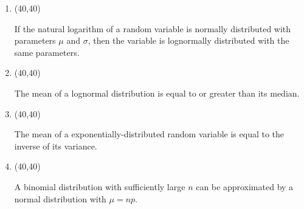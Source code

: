 \documentclass[11pt,twoside]{article}
\numberwithin{equation}{section}
\newcommand{\?}{\stackrel{?}{=}}
\newcommand{\gr}{\color{green!40!black}}
\begin{document}
\begin{enumerate}[\bf (a)]


\item \hfill
  \begin{minipage}{.1\linewidth}
    \framebox(40,40){\gr }
  \end{minipage}\quad
  \begin{minipage}{.85\linewidth}
    If the natural logarithm of a random variable is normally distributed with parameters $\mu$ and $\sigma$, then the
    variable is lognormally distributed with the same parameters.
   \end{minipage}
  
  \smallskip

  \item \hfill
    \begin{minipage}{.1\linewidth}
      \framebox(40,40){\gr  }
    \end{minipage}\quad
    \begin{minipage}{.85\linewidth}
      The mean of a lognormal distribution is equal to or greater than its median.
    \end{minipage}

    \smallskip

  \item \hfill
  \begin{minipage}{.1\linewidth}
    \framebox(40,40){\gr  }
  \end{minipage}\quad
  \begin{minipage}{.85\linewidth}
    The mean of a exponentially-distributed random variable is equal to the inverse of its variance.
   \end{minipage}

  \smallskip
  
\item \hfill
  \begin{minipage}{.1\linewidth}
    \framebox(40,40){\gr  }
  \end{minipage}\quad
  \begin{minipage}{.85\linewidth}
    A binomial distribution with sufficiently large $n$ can be approximated by a normal distribution with $\mu = np$.
  \end{minipage}



\end{enumerate}



 \eject  
\end{document}
